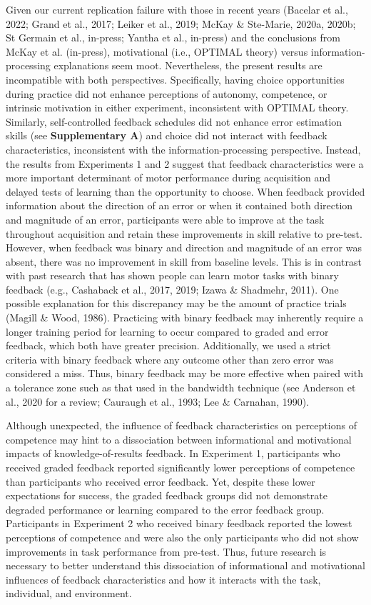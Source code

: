 \documentclass[
  man, donotrepeattitle,floatsintext]{apa7}
\begin{document}
Given our current replication failure with those in recent years (Bacelar et al., 2022; Grand et al., 2017; Leiker et al., 2019; McKay \& Ste-Marie, 2020a, 2020b; St Germain et al., in-press; Yantha et al., in-press) and the conclusions from McKay et al. (in-press), motivational (i.e., OPTIMAL theory) versus information-processing explanations seem moot. Nevertheless, the present results are incompatible with both perspectives. Specifically, having choice opportunities during practice did not enhance perceptions of autonomy, competence, or intrinsic motivation in either experiment, inconsistent with OPTIMAL theory. Similarly, self-controlled feedback schedules did not enhance error estimation skills (see \textbf{Supplementary A}) and choice did not interact with feedback characteristics, inconsistent with the information-processing perspective. Instead, the results from Experiments 1 and 2 suggest that feedback characteristics were a more important determinant of motor performance during acquisition and delayed tests of learning than the opportunity to choose. When feedback provided information about the direction of an error or when it contained both direction and magnitude of an error, participants were able to improve at the task throughout acquisition and retain these improvements in skill relative to pre-test. However, when feedback was binary and direction and magnitude of an error was absent, there was no improvement in skill from baseline levels. This is in contrast with past research that has shown people can learn motor tasks with binary feedback (e.g., Cashaback et al., 2017, 2019; Izawa \& Shadmehr, 2011). One possible explanation for this discrepancy may be the amount of practice trials (Magill \& Wood, 1986). Practicing with binary feedback may inherently require a longer training period for learning to occur compared to graded and error feedback, which both have greater precision. Additionally, we used a strict criteria with binary feedback where any outcome other than zero error was considered a miss. Thus, binary feedback may be more effective when paired with a tolerance zone such as that used in the bandwidth technique (see Anderson et al., 2020 for a review; Cauraugh et al., 1993; Lee \& Carnahan, 1990).

Although unexpected, the influence of feedback characteristics on perceptions of competence may hint to a dissociation between informational and motivational impacts of knowledge-of-results feedback. In Experiment 1, participants who received graded feedback reported significantly lower perceptions of competence than participants who received error feedback. Yet, despite these lower expectations for success, the graded feedback groups did not demonstrate degraded performance or learning compared to the error feedback group. Participants in Experiment 2 who received binary feedback reported the lowest perceptions of competence and were also the only participants who did not show improvements in task performance from pre-test. Thus, future research is necessary to better understand this dissociation of informational and motivational influences of feedback characteristics and how it interacts with the task, individual, and environment.
\end{document}
